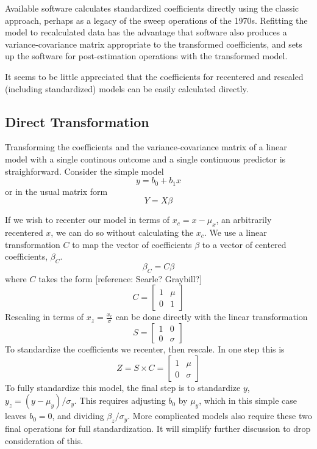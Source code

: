 \documentclass[]{article}
\begin{document}
Available software calculates standardized coefficients directly using
the classic approach, perhaps as a legacy of the sweep operations of the
1970s. Refitting the model to recalculated data has the advantage that
software also produces a variance-covariance matrix appropriate to the
transformed coefficients, and sets up the software for post-estimation
operations with the transformed model.

It seems to be little appreciated that the coefficients for recentered
and rescaled (including standardized) models can be easily calculated
directly.

\subsection{Direct Transformation}\label{direct-transformation}

Transforming the coefficients and the variance-covariance matrix of a
linear model with a single continous outcome and a single continuous
predictor is straighforward. Consider the simple model
\[y = b_0 + b_1x\] or in the usual matrix form \[Y=X\beta\]

If we wish to recenter our model in terms of \(x_c=x-\mu_x\), an
arbitrarily recentered \(x\), we can do so without calculating the
\(x_c\). We use a linear transformation \(C\) to map the vector of
coefficients \(\beta\) to a vector of centered coefficients,
\(\beta_C\). \[\beta_C=C\beta\] where \(C\) takes the form {[}reference:
Searle? Graybill?{]} \[C=\begin{bmatrix}1 & \mu \\ 0 & 1 \end{bmatrix}\]
Rescaling in terms of \(x_z=\frac{x_c}{\sigma}\) can be done directly
with the linear transformation
\[S=\begin{bmatrix}1 & 0 \\ 0 & \sigma \end{bmatrix}\] To standardize
the coefficients we recenter, then rescale. In one step this is
\[Z = S \times C =\begin{bmatrix}1 & \mu \\ 0 & \sigma \end{bmatrix}\]
To fully standardize this model, the final step is to standardize \(y\),
\(y_z=(y-\mu_y)/\sigma_y\). This requires adjusting \(b_0\) by
\(\mu_y\), which in this simple case leaves \(b_0=0\), and dividing
\(\beta_z/\sigma_y\). More complicated models also require these two
final operations for full standardization. It will simplify further
discussion to drop consideration of this.
\end{document}
